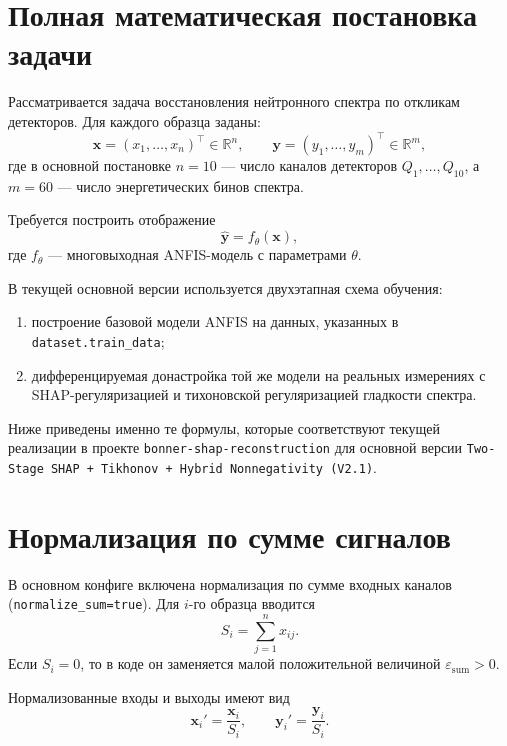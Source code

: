 \documentclass[11pt]{article}
\begin{document}
\section{Полная математическая постановка задачи}

Рассматривается задача восстановления нейтронного спектра по откликам детекторов. Для каждого образца заданы:
\begin{equation}
\mathbf{x} = (x_1,\dots,x_n)^\top \in \mathbb{R}^n,
\qquad
\mathbf{y} = (y_1,\dots,y_m)^\top \in \mathbb{R}^m,
\end{equation}
где в основной постановке $n=10$ --- число каналов детекторов $Q_1,\dots,Q_{10}$, а $m=60$ --- число энергетических бинов спектра.

Требуется построить отображение
\begin{equation}
\hat{\mathbf{y}} = f_{\theta}(\mathbf{x}),
\end{equation}
где $f_{\theta}$ --- многовыходная ANFIS-модель с параметрами $\theta$.

В текущей основной версии используется двухэтапная схема обучения:
\begin{enumerate}
    \item построение базовой модели ANFIS на данных, указанных в \texttt{dataset.train\_data};
    \item дифференцируемая донастройка той же модели на реальных измерениях с SHAP-регуляризацией и тихоновской регуляризацией гладкости спектра.
\end{enumerate}

Ниже приведены именно те формулы, которые соответствуют текущей реализации в проекте \texttt{bonner-shap-reconstruction} для основной версии \texttt{Two-Stage SHAP + Tikhonov + Hybrid Nonnegativity (V2.1)}.

\section{Нормализация по сумме сигналов}

В основном конфиге включена нормализация по сумме входных каналов (\texttt{normalize\_sum=true}). Для $i$-го образца вводится
\begin{equation}
S_i = \sum_{j=1}^{n} x_{ij}.
\end{equation}
Если $S_i = 0$, то в коде он заменяется малой положительной величиной $\varepsilon_{\mathrm{sum}} > 0$.

Нормализованные входы и выходы имеют вид
\begin{equation}
\mathbf{x}_i' = \frac{\mathbf{x}_i}{S_i},
\qquad
\mathbf{y}_i' = \frac{\mathbf{y}_i}{S_i}.
\end{equation}
\end{document}
